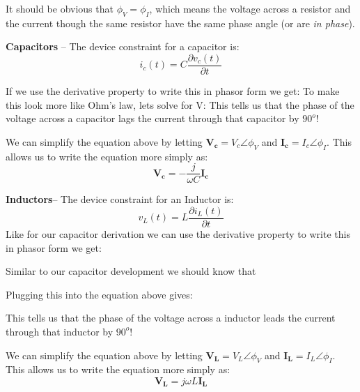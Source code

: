 \documentclass{handout}
\begin{document}
It should be obvious that $\phi_V = \phi_I$, which means the voltage across a resistor and the current though the same resistor have the same phase angle (or are {\em in phase}).

\textbf{Capacitors} -- The device constraint for a capacitor is:
\[
i_c(t) = C\frac{\partial v_c(t)}{\partial t}
\]

If we use the derivative property to write this in phasor form we get:
\soln{2in}{
\[
I_c\angle \phi_I =  j\omega C V_c \angle \phi_V
\]
}
To make this look more like Ohm's law, lets solve for V:
This tells us that the phase of the voltage across a capacitor lags the current through that capacitor by $90^o$!

We can simplify the equation above by letting $\mathbf{V_c} = V_c\angle \phi_V$ and $\mathbf{I_c} = I_c\angle \phi_I$.  This allows us to write the equation more simply as:
\[
\mathbf{V_c}  = -\frac{j}{\omega C}\mathbf{I_c}
\]

\textbf{Inductors}-- The device constraint for an Inductor is:
\[
v_L(t) = L\frac{\partial i_L(t)}{\partial t}
\]
Like for our capacitor derivation we can use the derivative property to write this in phasor form we get:
\soln{2in}{
\[
V_L\angle \phi_V =j\omega L  I_L \angle \phi_I
\]
}

Similar to our capacitor development we should know that
\soln{1in}{
\[
j\omega L = \omega L \angle 90^o
\]
}

Plugging this into the equation above gives:
\soln{1in}{
\[
V_L\angle \phi_V =\omega L \angle 90^o  I_L \angle \phi_I=\omega L I_L \angle \left(\phi_I+90^o \right)
\]
}

This tells us that the phase of the voltage across a inductor leads the current through that inductor by $90^o$!

We can simplify the equation above by letting $\mathbf{V_L} = V_L\angle \phi_V$ and $\mathbf{I_L} = I_L\angle \phi_I$.  This allows us to write the equation more simply as:
\[
\mathbf{V_L}  = j\omega L\mathbf{I_L}
\]
\end{document}
